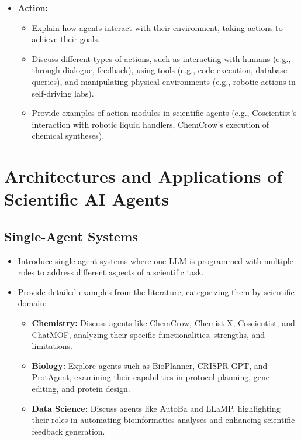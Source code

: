 \documentclass{article}
\begin{document}
\begin{itemize}
\begin{itemize}
    \end{itemize}
    \item \textbf{Action:}
    \begin{itemize}
        \item Explain how agents interact with their environment, taking actions to achieve their goals.
        \item Discuss different types of actions, such as interacting with humans (e.g., through dialogue, feedback), using tools (e.g., code execution, database queries), and manipulating physical environments (e.g., robotic actions in self-driving labs).
        \item Provide examples of action modules in scientific agents (e.g., Coscientist's interaction with robotic liquid handlers, ChemCrow's execution of chemical syntheses).
    \end{itemize}
\end{itemize}

\section{Architectures and Applications of Scientific AI Agents}

\subsection{Single-Agent Systems}
\begin{itemize}
    \item Introduce single-agent systems where one LLM is programmed with multiple roles to address different aspects of a scientific task.
    \item Provide detailed examples from the literature, categorizing them by scientific domain:
    \begin{itemize}
        \item \textbf{Chemistry:} Discuss agents like ChemCrow, Chemist-X, Coscientist, and ChatMOF, analyzing their specific functionalities, strengths, and limitations.
        \item \textbf{Biology:} Explore agents such as BioPlanner, CRISPR-GPT, and ProtAgent, examining their capabilities in protocol planning, gene editing, and protein design.
        \item \textbf{Data Science:} Discuss agents like AutoBa and LLaMP, highlighting their roles in automating bioinformatics analyses and enhancing scientific feedback generation.
    \end{itemize}
\end{itemize}
\end{document}
